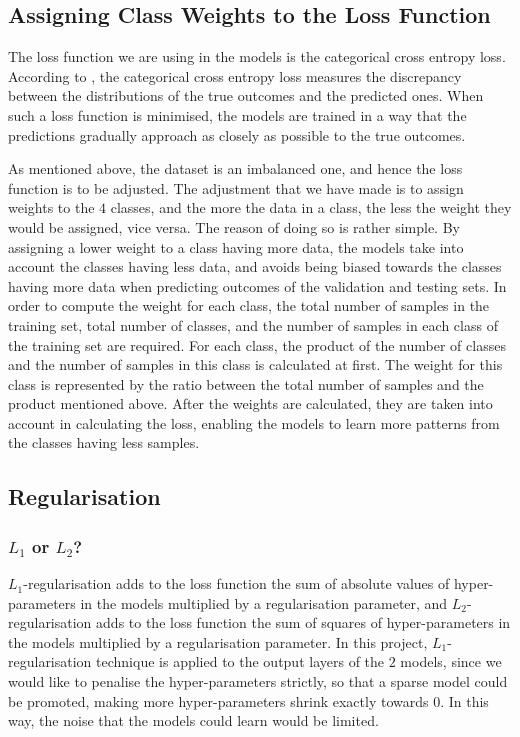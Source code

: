 \documentclass[11pt,twoside]{article}
\numberwithin{Theorem}{section}
\numberwithin{Definition}{section}
\numberwithin{Lemma}{section}
\numberwithin{Algorithm}{section}
\numberwithin{equation}{section}
\begin{document}
\subsection{Assigning Class Weights to the Loss Function}
The loss function we are using in the models is the categorical cross entropy loss. According to \cite{chollet2021deep}, the categorical cross entropy loss measures the discrepancy between the distributions of the true outcomes and the predicted ones. When such a loss function is minimised, the models are trained in a way that the predictions gradually approach as closely as possible to the true outcomes. 

As mentioned above, the dataset is an imbalanced one, and hence the loss function is to be adjusted. The adjustment that we have made is to assign weights to the $4$ classes, and the more the data in a class, the less the weight they would be assigned, vice versa. The reason of doing so is rather simple. By assigning a lower weight to a class having more data, the models take into account the classes having less data, and avoids being biased towards the classes having more data when predicting outcomes of the validation and testing sets. In order to compute the weight for each class, the total number of samples in the training set, total number of classes, and the number of samples in each class of the training set are required. For each class, the product of the number of classes and the number of samples in this class is calculated at first. The weight for this class is represented by the ratio between the total number of samples and the product mentioned above. After the weights are calculated, they are taken into account in calculating the loss, enabling the models to learn more patterns from the classes having less samples.

\subsection{Regularisation}

\subsubsection{$L_1$ or $L_2$?}
$L_1$-regularisation adds to the loss function the sum of absolute values of hyper-parameters in the models multiplied by a regularisation parameter, and $L_2$-regularisation adds to the loss function the sum of squares of hyper-parameters in the models multiplied by a regularisation parameter. In this project, $L_1$-regularisation technique is applied to the output layers of the $2$ models, since we would like to penalise the hyper-parameters strictly, so that a sparse model could be promoted, making more hyper-parameters shrink exactly towards $0$. In this way, the noise that the models could learn would be limited.
\end{document}
